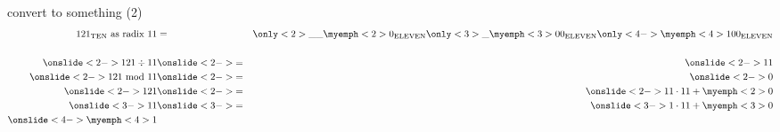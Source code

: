 \begin{frame}{convert to something (2)}
\begin{eqnarray*}
    121_\text{TEN} \text{~as radix 11} &=& \only<2>{\_\_\myemph<2>{0}_\text{ELEVEN}}\only<3>{\_\myemph<3>{0}0_\text{ELEVEN}}%
    \only<4->{\myemph<4>{1}00_\text{ELEVEN}} \\
    ~ \\
    \onslide<2->{121 \div 11} & \onslide<2->{=} & \onslide<2->{11} \\
    \onslide<2->{121 \text{~mod~} 11} & \onslide<2->{=} & \onslide<2->{0} \\
    \onslide<2->{121} & \onslide<2->{=} & \onslide<2->{11 \cdot 11 + \myemph<2>{0}} \\
    \onslide<3->{11} & \onslide<3->{=} & \onslide<3->{1 \cdot 11 + \myemph<3>{0}} \\
    \onslide<4->{\myemph<4>{1}}
\end{eqnarray*}
\end{frame}

